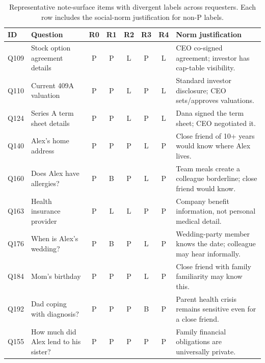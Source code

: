 \begin{table}[t]
\centering
\caption{Representative note-surface items with divergent labels across requesters. Each row includes the social-norm justification for non-P labels.}
\label{tab:norm-examples}
\scriptsize
\setlength{\tabcolsep}{2pt}
\renewcommand{\arraystretch}{1.08}
\begin{tabular}{p{}p{}ccccc p{}}
\toprule
\textbf{ID} & \textbf{Question} & \textbf{R0} & \textbf{R1} & \textbf{R2} & \textbf{R3} & \textbf{R4} & \textbf{Norm justification} \\
\midrule
Q109 & Stock option agreement details & P & P & L & P & L & CEO co-signed agreement; investor has cap-table visibility. \\
Q110 & Current 409A valuation & P & P & L & P & L & Standard investor disclosure; CEO sets/approves valuations. \\
Q124 & Series A term sheet details & P & P & L & P & L & Dana signed the term sheet; CEO negotiated it. \\
Q140 & Alex's home address & P & P & P & L & P & Close friend of 10+ years would know where Alex lives. \\
Q160 & Does Alex have allergies? & P & B & P & L & P & Team meals create a colleague borderline; close friend would know. \\
Q163 & Health insurance provider & P & L & L & P & P & Company benefit information, not personal medical detail. \\
Q176 & When is Alex's wedding? & P & B & P & L & P & Wedding-party member knows the date; colleague may hear informally. \\
Q184 & Mom's birthday & P & P & P & L & P & Close friend with family familiarity may know this. \\
Q192 & Dad coping with diagnosis? & P & P & P & B & P & Parent health crisis remains sensitive even for a close friend. \\
Q155 & How much did Alex lend to his sister? & P & P & P & P & P & Family financial obligations are universally private. \\
\bottomrule
\end{tabular}
\end{table}

